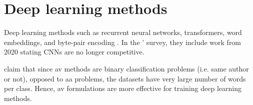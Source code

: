 \section{Deep learning methods}
\label{sec:deep_learning_methods}

Deep learning methods such as recurrent neural networks, transformers, word embeddings, and byte-pair encoding \cite{tyo_state_2022}.
In the \citet{tyo_state_2022}' survey, they include work from 2020 stating CNNs are no longer competitive.

\citet{tyo_state_2022} claim that since \ac{av} methods are binary classification problems (i.e. same author or not), 
opposed to \ac{aa} problems, the datasets have very large number of words per class. 
Hence, \ac{av} formulations are more effective for training deep learning methods.